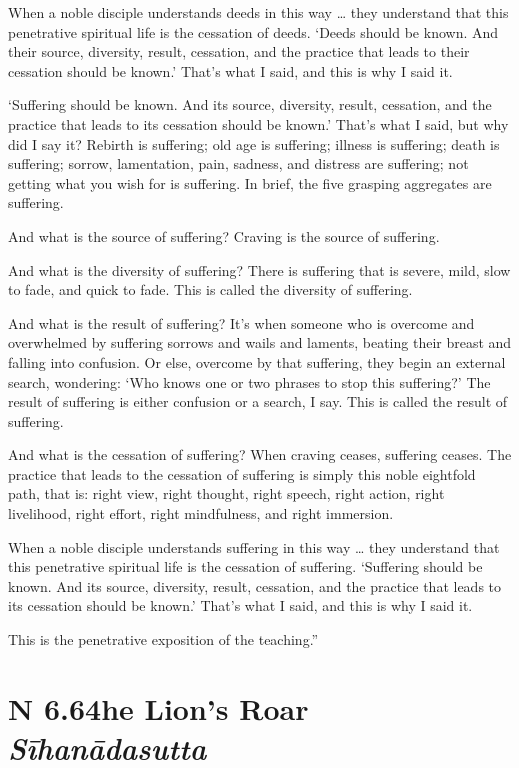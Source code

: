 \documentclass[12pt,openany]{book}%
\newcommand*{\suttatitleacronym}[1]{\smaller[2]{#1}\vspace*{.3em}}
\newcommand*{\suttatitletranslation}[1]{\linebreak{#1}}
\newcommand*{\suttatitleroot}[1]{\linebreak\smaller[2]\itshape{#1}}
\newcommand*{\tocacronym}[1]{\hspace*{-3.3em}{#1}\quad}
\newcommand*{\toctranslation}[1]{#1}
\newcommand*{\tocroot}[1]{(\textit{#1})}
\begin{document}
When a noble disciple understands deeds in this way … they understand that this penetrative spiritual life is the cessation of deeds. ‘Deeds should be known. And their source, diversity, result, cessation, and the practice that leads to their cessation should be known.’ That’s what I said, and this is why I said it. 

‘Suffering should be known. And its source, diversity, result, cessation, and the practice that leads to its cessation should be known.’ That’s what I said, but why did I say it? Rebirth is suffering; old age is suffering; illness is suffering; death is suffering; sorrow, lamentation, pain, sadness, and distress are suffering; not getting what you wish for is suffering. In brief, the five grasping aggregates are suffering. 

And what is the source of suffering? Craving is the source of suffering. 

And what is the diversity of suffering? There is suffering that is severe, mild, slow to fade, and quick to fade. This is called the diversity of suffering. 

And what is the result of suffering? It’s when someone who is overcome and overwhelmed by suffering sorrows and wails and laments, beating their breast and falling into confusion. Or else, overcome by that suffering, they begin an external search, wondering: ‘Who knows one or two phrases to stop this suffering?’ The result of suffering is either confusion or a search, I say. This is called the result of suffering. 

And what is the cessation of suffering? When craving ceases, suffering ceases. The practice that leads to the cessation of suffering is simply this noble eightfold path, that is: right view, right thought, right speech, right action, right livelihood, right effort, right mindfulness, and right immersion. 

When a noble disciple understands suffering in this way … they understand that this penetrative spiritual life is the cessation of suffering. ‘Suffering should be known. And its source, diversity, result, cessation, and the practice that leads to its cessation should be known.’ That’s what I said, and this is why I said it. 

This is the penetrative exposition of the teaching.” 

%
\section*{{\suttatitleacronym AN 6.64}{\suttatitletranslation The Lion’s Roar }{\suttatitleroot Sīhanādasutta}}
\addcontentsline{toc}{section}{\tocacronym{AN 6.64} \toctranslation{The Lion’s Roar } \tocroot{Sīhanādasutta}}
\end{document}

